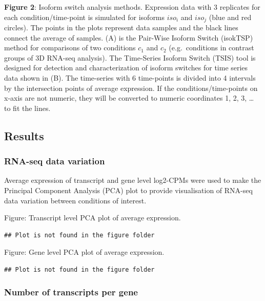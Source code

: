 \documentclass[]{article}
\begin{document}
\textbf{Figure 2}: Isoform switch analysis methods. Expression data with
3 replicates for each condition/time-point is simulated for isoforms
\(iso_{i}\) and \(iso_j\) (blue and red circles). The points in the
plots represent data samples and the black lines connect the average of
samples. (A) is the Pair-Wise Isoform Switch (isokTSP) method for
comparisons of two conditions \(c_1\) and \(c_2\) (e.g.~conditions in
contrast groups of 3D RNA-seq analysis). The Time-Series Isoform Switch
(TSIS) tool is designed for detection and characterization of isoform
switches for time series data shown in (B). The time-series with 6
time-points is divided into 4 intervals by the intersection points of
average expression. If the conditions/time-points on x-axis are not
numeric, they will be converted to numeric coordinates 1, 2, 3, \ldots{}
to fit the lines.

\subsection{Results}\label{results}

\subsubsection{RNA-seq data variation}\label{rna-seq-data-variation}

Average expression of transcript and gene level log2-CPMs were used to
make the Principal Component Analysis (PCA) plot to provide
visualisation of RNA-seq data variation between conditions of interest.

Figure: Transcript level PCA plot of average expression.

\begin{verbatim}
## Plot is not found in the figure folder
\end{verbatim}

Figure: Gene level PCA plot of average expression.

\begin{verbatim}
## Plot is not found in the figure folder
\end{verbatim}

\subsubsection{Number of transcripts per
gene}\label{number-of-transcripts-per-gene}
\end{document}
